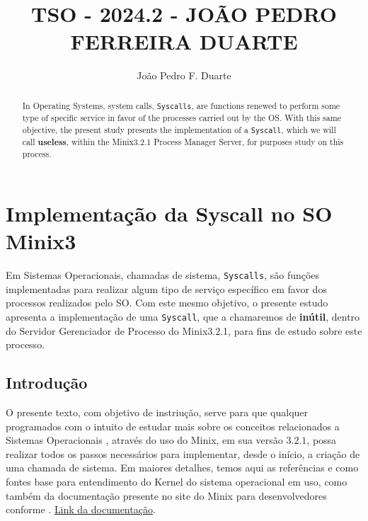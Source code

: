 \documentclass[12pt]{article}
\title{TSO - 2024.2 - JOÃO PEDRO FERREIRA DUARTE}
\author{João Pedro F. Duarte\inst{1} }
\begin{document}
 

\maketitle

\section{Implementação da Syscall no SO Minix3}

\begin{abstract}
    In Operating Systems, system calls, \texttt{Syscalls}, are functions renewed to perform some type of specific service in favor of the processes carried out by the OS.
    With this same objective, the present study presents the implementation of a \texttt{Syscall}, which we will call \textbf{useless}, within the Minix3.2.1 Process Manager Server, for purposes
    study on this process.
\end{abstract}
     
\begin{resumo}
Em Sistemas Operacionais, chamadas de sistema, \texttt{Syscalls}, são funções implementadas para realizar algum tipo de serviço específico em favor dos processos realizados pelo SO.
    Com este mesmo objetivo, o presente estudo apresenta a implementação de uma \texttt{Syscall}, que a chamaremos de \textbf{inútil}, dentro do Servidor Gerenciador de Processo do Minix3.2.1, para fins
de estudo sobre este processo.
\end{resumo}


\subsection{Introdução} %

O presente texto, com objetivo de instriução, serve para que qualquer programados com o intuito de estudar mais sobre os conceitos relacionados a Sistemas Operacionais
, através do uso do Minix, em sua versão $3.2.1$, possa realizar todos os passos necessários para implementar, desde o início, a criação de uma chamada de sistema. Em
maiores detalhes, temos aqui as referências \cite{creating_syscall} e \cite{tanenbaum_modern_os} como fontes base para entendimento do Kernel do sistema operacional em uso,
como também da documentação presente no site do Minix para desenvolvedores conforme \cite{minix3docs}. \href{https://www.minix3.org/doc/}{Link da documentação}.
%
\end{document}
